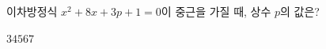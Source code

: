 이차방정식 $x^2+8x+3p+1=0$이 중근을 가질 때, 상수 $p$의 값은?
\begin{choices32}{$3$}{$4$}{$5$}{$6$}{$7$}\end{choices32}
